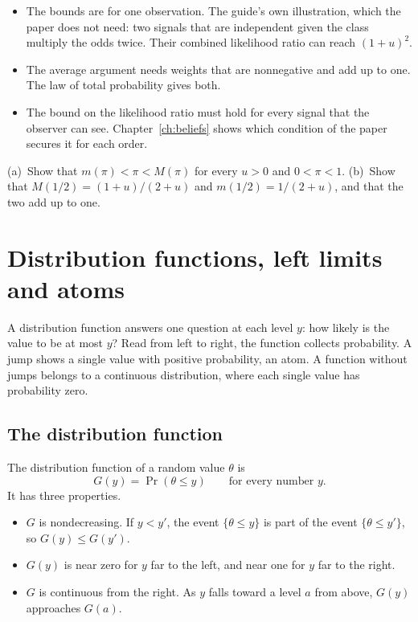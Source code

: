\begin{watchout}
\begin{itemize}
\item The bounds are for one observation. The guide's own illustration, which the paper does not need: two
signals that are independent given the class multiply the odds twice. Their combined likelihood ratio can reach
\((1+u)^2\).
\item The average argument needs weights that are nonnegative and add up to one. The law of total probability
gives both.
\item The bound on the likelihood ratio must hold for every signal that the observer can see. Chapter~\ref{ch:beliefs}
shows which condition of the paper secures it for each order.
\end{itemize}
\end{watchout}

\begin{checkyourself}\label{q:toolkit-odds}
(a)~Show that \(m(\pi)<\pi<M(\pi)\) for every \(u>0\) and \(0<\pi<1\).
(b)~Show that \(M(1/2)=(1+u)/(2+u)\) and \(m(1/2)=1/(2+u)\), and that the two add up to one.
\end{checkyourself}

\section{Distribution functions, left limits and atoms}\label{sec:toolkit-cdf}

\begin{intuition}
A distribution function answers one question at each level \(y\): how likely is the value to be at most \(y\)?
Read from left to right, the function collects probability. A jump shows a single value with positive
probability, an atom. A function without jumps belongs to a continuous distribution, where each single value has
probability zero.
\end{intuition}

\subsection{The distribution function}

The distribution function of a random value \(\theta\) is
\begin{equation}\label{eq:toolkit-cdf}
G(y)=\Pr(\theta\le y)\qquad\text{for every number }y.
\end{equation}
It has three properties.
\begin{itemize}
\item \(G\) is nondecreasing. If \(y<y'\), the event \(\{\theta\le y\}\) is part of the event \(\{\theta\le
y'\}\), so \(G(y)\le G(y')\).
\item \(G(y)\) is near zero for \(y\) far to the left, and near one for \(y\) far to the right.
\item \(G\) is continuous from the right. As \(y\) falls toward a level \(a\) from above, \(G(y)\) approaches
\(G(a)\).
\end{itemize}

